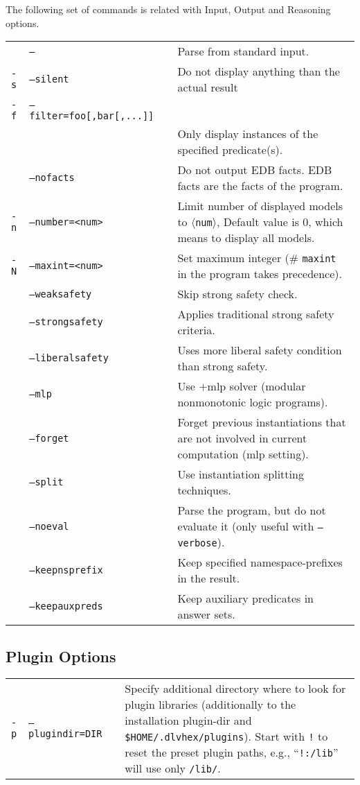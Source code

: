 \documentclass[a4paper, titlepage]{article}
\begin{document}
The following set of commands is related with Input, Output and  Reasoning options.
\renewcommand{\arraystretch}{1.4}
\begin{longtable}{ p{2.0em} p{2.2cm} p{0.6cm} p{8.0cm} } 
 & \texttt{--}& & Parse from standard input. \\ 
\texttt{-s} & \texttt{--silent}&& Do not display anything than the actual result \\ 
\texttt{-f} & \texttt{--filter=foo[,bar[,...]]} && \\
& & & Only display instances of the specified predicate(s).\\
& \texttt{--nofacts} && Do not output EDB facts. EDB facts are the facts of the program.  \\
\texttt{-n} & \texttt{--number=<num>} && Limit number of displayed models to $\langle$\texttt{num}$\rangle$, Default value is 0, which means to display all models.\\ 
\texttt{-N} & \texttt{--maxint=<num>} && Set maximum integer (\# \texttt{maxint} in the program takes precedence). \\
 & \texttt{--weaksafety} && Skip strong safety check.\\
 & \texttt{--strongsafety} && Applies traditional strong safety criteria. \\
  & \texttt{--liberalsafety} && Uses more liberal safety condition than strong safety. \\
  &\texttt{--mlp}&& Use \dlvhex{}$+$mlp solver (modular nonmonotonic logic programs).\\
  & \texttt{--forget} && Forget previous instantiations that are not involved in current computation (mlp setting). \\
  & \texttt{--split} &&Use instantiation splitting techniques.\\
  & \texttt{--noeval} && Parse the program, but do not evaluate it (only useful with \texttt{--verbose}). \\
  & \texttt{--keepnsprefix} && Keep specified namespace-prefixes in the result. \\
  & \texttt{--keepauxpreds} && Keep auxiliary predicates in answer sets. \\
\end{longtable}
\bigskip
\subsection{Plugin Options}
\begin{longtable}{ p{2.0em} p{2.2cm} p{0.6cm} p{8.0cm} } 
 \texttt{-p}&\texttt{--plugindir=DIR}&&Specify additional directory where to look for plugin libraries (additionally to the installation plugin-dir and \texttt{\$HOME/.dlvhex/plugins}). Start with \texttt{!} to reset the preset plugin paths, e.g., ``\texttt{!:/lib}'' will use only \texttt{/lib/}.
 \\
\end{longtable}
\end{document}
